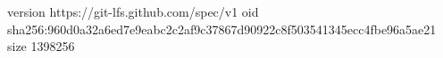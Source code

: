 version https://git-lfs.github.com/spec/v1
oid sha256:960d0a32a6ed7e9eabc2c2af9c37867d90922c8f503541345ecc4fbe96a5ae21
size 1398256
